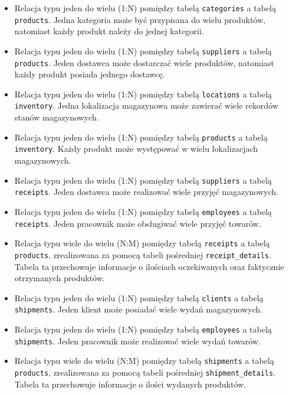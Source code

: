 \begin{itemize}
    \item Relacja typu jeden do wielu (1:N) pomiędzy tabelą
    \texttt{categories} a tabelą \texttt{products}.
    Jedna kategoria może być przypisana do wielu produktów,
    natomiast każdy produkt należy do jednej kategorii.

    \item Relacja typu jeden do wielu (1:N) pomiędzy tabelą
    \texttt{suppliers} a tabelą \texttt{products}.
    Jeden dostawca może dostarczać wiele produktów,
    natomiast każdy produkt posiada jednego dostawcę.

    \item Relacja typu jeden do wielu (1:N) pomiędzy tabelą
    \texttt{locations} a tabelą \texttt{inventory}.
    Jedna lokalizacja magazynowa może zawierać wiele rekordów stanów magazynowych.

    \item Relacja typu jeden do wielu (1:N) pomiędzy tabelą
    \texttt{products} a tabelą \texttt{inventory}.
    Każdy produkt może występować w wielu lokalizacjach magazynowych.

    \item Relacja typu jeden do wielu (1:N) pomiędzy tabelą
    \texttt{suppliers} a tabelą \texttt{receipts}.
    Jeden dostawca może realizować wiele przyjęć magazynowych.

    \item Relacja typu jeden do wielu (1:N) pomiędzy tabelą
    \texttt{employees} a tabelą \texttt{receipts}.
    Jeden pracownik może obsługiwać wiele przyjęć towarów.

    \item Relacja typu wiele do wielu (N:M) pomiędzy tabelą
    \texttt{receipts} a tabelą \texttt{products},
    zrealizowana za pomocą tabeli pośredniej \texttt{receipt\_details}.
    Tabela ta przechowuje informacje o ilościach oczekiwanych oraz faktycznie
    otrzymanych produktów.

    \item Relacja typu jeden do wielu (1:N) pomiędzy tabelą
    \texttt{clients} a tabelą \texttt{shipments}.
    Jeden klient może posiadać wiele wydań magazynowych.

    \item Relacja typu jeden do wielu (1:N) pomiędzy tabelą
    \texttt{employees} a tabelą \texttt{shipments}.
    Jeden pracownik może realizować wiele wydań towarów.

    \item Relacja typu wiele do wielu (N:M) pomiędzy tabelą
    \texttt{shipments} a tabelą \texttt{products},
    zrealizowana za pomocą tabeli pośredniej \texttt{shipment\_details}.
    Tabela ta przechowuje informacje o ilości wydanych produktów.
\end{itemize}

